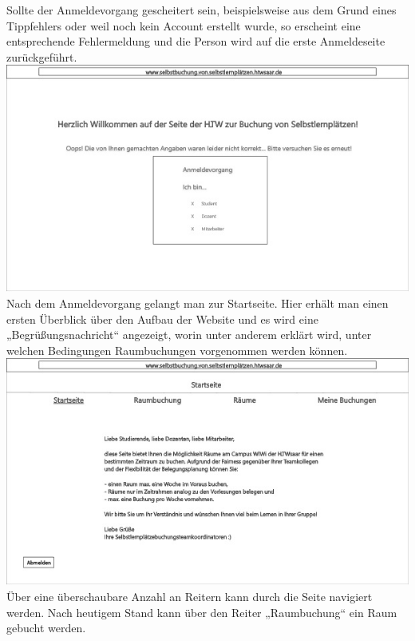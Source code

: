 \documentclass[a4paper,12pt]{article}
\begin{document}
Sollte der Anmeldevorgang gescheitert sein, beispielsweise aus dem Grund eines Tippfehlers oder weil noch kein Account erstellt wurde, so erscheint eine entsprechende Fehlermeldung und die Person wird auf die erste Anmeldeseite zurückgeführt.\\

\includegraphics{Bilder/UI3}\label{UI_3}\\

Nach dem Anmeldevorgang gelangt man zur Startseite. Hier erhält man einen ersten Überblick über den Aufbau der Website und es wird eine „Begrüßungsnachricht“ angezeigt, worin unter anderem erklärt wird, unter welchen Bedingungen Raumbuchungen vorgenommen werden können.\\

\includegraphics{Bilder/UI4}\label{UI_4}\\

Über eine überschaubare Anzahl an Reitern kann durch die Seite navigiert werden. Nach heutigem Stand kann über den Reiter „Raumbuchung“ ein Raum gebucht werden.\\
\end{document}
